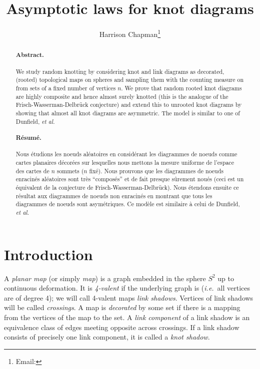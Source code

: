 \documentclass[submission%
]{dmtcs}
\author{Harrison Chapman\addressmark{1}\thanks{Email: \email{hchapman@math.uga.edu}}}
\title[Asymptotic laws for knot diagrams]{Asymptotic laws for knot diagrams}
\begin{document}
\maketitle
\begin{abstract}
  \paragraph{Abstract.}
  We study random knotting by considering knot and link diagrams as
  decorated, (rooted) topological maps on spheres and sampling them
  with the counting measure on from sets of a fixed number of vertices
  $n$. We prove that random rooted knot diagrams are highly composite
  and hence almost surely knotted (this is the analogue of the
  Frisch-Wasserman-Delbr\"uck conjecture) and extend this to unrooted
  knot diagrams by showing that almost all knot diagrams are
  asymmetric. The model is similar to one of Dunfield, \textit{et al.}

  \paragraph{R\'esum\'e.} Nous \'etudions les noeuds al\'eatoires en
  consid\'erant les diagrammes de noeuds comme cartes planaires
  d\'ecor\'ees sur lesquelles nous mettons la mesure uniforme de
  l'espace des cartes de $n$ sommets ($n$ fix\'e). Nous prouvons que
  les diagrammes de noeuds enracin\'es al\'eatoires sont tr\`es
  ``compos\'es'' et de fait presque s\^{u}rement nou\'es (ceci est un
  \'equivalent de la conjecture de Frisch-Wasserman-Delbr\"uck). Nous
  \'etendons ensuite  ce r\'esultat aux diagrammes de noeuds
  non enracin\'es en montrant que tous les diagrammes de noeuds sont
  asym\'etriques. Ce mod\`ele est similaire \`a celui de Dunfield,
  \textit{et al.}
\end{abstract}

\section{Introduction}
\label{sec:in}

A \emph{planar map} (or simply \emph{map}) is a graph embedded in the
sphere $S^2$ up to continuous deformation. It is \emph{4-valent} if
the underlying graph is (\textit{i.e.}\ all vertices are of degree 4); we will
call 4-valent maps \emph{link shadows}. Vertices of link shadows will
be called \emph{crossings}. A map is \emph{decorated} by some set if
there is a mapping from the vertices of the map to the set. A
\emph{link component} of a link shadow is an equivalence class of
edges meeting opposite across crossings. If a link shadow consists of
precisely one link component, it is called a \emph{knot shadow}.
\end{document}
